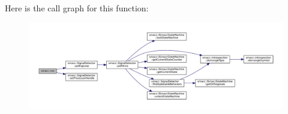 Here is the call graph for this function\+:
\nopagebreak
\begin{figure}[H]
\begin{center}
\leavevmode
\includegraphics[width=350pt]{namespacesmacc_a47ac3b8d2968b1ba4152afd64ab66bd0_cgraph}
\end{center}
\end{figure}


